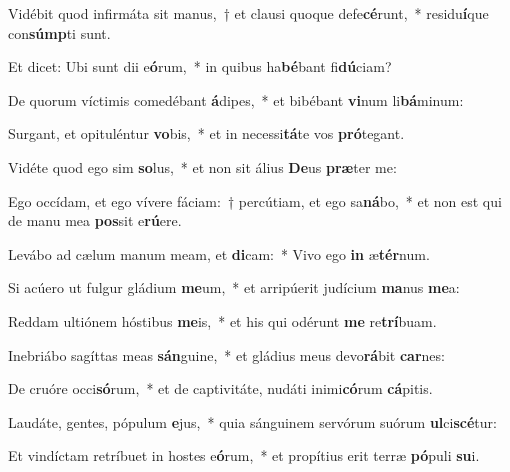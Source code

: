 \item Vidébit quod infirmáta sit manus,~† et clausi quoque defe\textbf{cé}runt,~* residu\textbf{í}que con\textbf{súmp}ti sunt.
\item Et dicet: Ubi sunt dii e\textbf{ó}rum,~* in quibus ha\textbf{bé}bant fi\textbf{dú}ciam?
\item De quorum víctimis comedébant \textbf{á}dipes,~* et bibébant \textbf{vi}num li\textbf{bá}minum:
\item Surgant, et opituléntur \textbf{vo}bis,~* et in necessi\textbf{tá}te vos \textbf{pró}tegant.
\item Vidéte quod ego sim \textbf{so}lus,~* et non sit álius \textbf{De}us \textbf{præ}ter me:
\item Ego occídam, et ego vívere fáciam:~† percútiam, et ego sa\textbf{ná}bo,~* et non est qui de manu mea \textbf{pos}sit e\textbf{rú}ere.
\item Levábo ad cælum manum meam, et \textbf{di}cam:~* Vivo ego \textbf{in} æ\textbf{tér}num.
\item Si acúero ut fulgur gládium \textbf{me}um,~* et arripúerit judícium \textbf{ma}nus \textbf{me}a:
\item Reddam ultiónem hóstibus \textbf{me}is,~* et his qui odérunt \textbf{me} re\textbf{trí}buam.
\item Inebriábo sagíttas meas \textbf{sán}guine,~* et gládius meus devo\textbf{rá}bit \textbf{car}nes:
\item De cruóre occi\textbf{só}rum,~* et de captivitáte, nudáti inimi\textbf{có}rum \textbf{cá}pitis.
\item Laudáte, gentes, pópulum \textbf{e}jus,~* quia sánguinem servórum suórum \textbf{ul}ci\textbf{scé}tur:
\item Et vindíctam retríbuet in hostes e\textbf{ó}rum,~* et propítius erit terræ \textbf{pó}puli \textbf{su}i.
